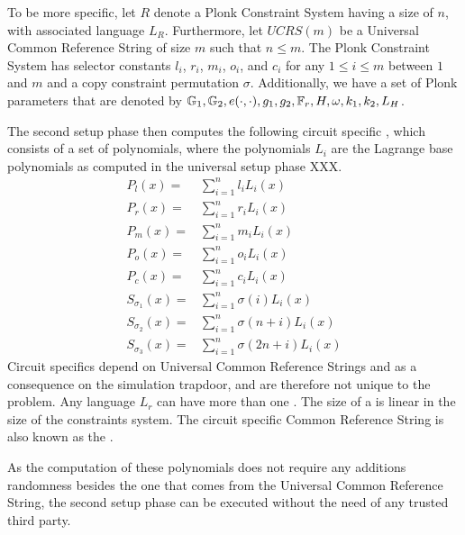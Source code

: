 To be more specific, let $R$ denote a Plonk Constraint System having a size of $n$, with associated language $L_R$. Furthermore, let $UCRS(m)$ be a Universal Common Reference String of size $m$ such that $n\leq m$. The Plonk Constraint System has selector constants $l_i$, $r_i$, $m_i$, $o_i$, and $c_i$ for any $1\leq i \leq m$ between $1$ and $m$ and a copy constraint permutation $\sigma$. Additionally, we have a set of Plonk parameters that are denoted by ${\mathbb{G}_1, \mathbb{G}_2, e(\cdot,\cdot), g_1, g_2, \mathbb{F}_r, H, \omega, k_1, k_2, L_H}$.

The second setup phase then computes the following circuit specific , which consists of a set of polynomials, where the polynomials $L_i$ are the Lagrange base polynomials as computed in the universal setup phase XXX.
\begin{equation}
\label{def:plonk-circuit-crs}
\begin{array}{rl}
P_{l}(x) = &\sum_{i=1}^{n} {l_i}L_i(x)\\
P_{r}(x) = &\sum_{i=1}^{n} {r_i}L_i(x)\\
P_{m}(x) = &\sum_{i=1}^{n} {m_i}L_i(x)\\
P_{o}(x) = &\sum_{i=1}^{n} {o_i}L_i(x)\\
P_{c}(x) = &\sum_{i=1}^{n} {c_i}L_i(x)\\
S_{\sigma_1}(x) =& \sum_{i=1}^{n} \sigma(i)L_i(x)\\
S_{\sigma_2}(x) =& \sum_{i=1}^{n} \sigma(n+i)L_i(x)\\
S_{\sigma_3}(x) =& \sum_{i=1}^{n} \sigma(2n+i)L_i(x)
\end{array}
\end{equation}
Circuit specifics depend on Universal Common Reference Strings and as a consequence on the simulation trapdoor, and are therefore not unique to the problem. Any language $L_r$ can have more than one . The  size of a  is linear in the size of the constraints system. The circuit specific Common Reference String is also known as the .

As the computation of these polynomials does not require any additions randomness besides the one that comes from the Universal Common Reference String, the second setup phase can be executed without the need of any trusted third party.

